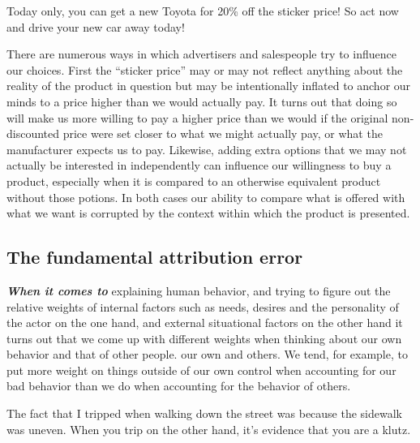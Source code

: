 \documentclass[12pt, openany]{book}
\begin{document}
\begin{center}

\begin{argument}

Today only, you can get a new Toyota for 20\% off the sticker price! So act now and drive your new car away today!

\end{argument}

\end{center}

There are numerous ways in which advertisers and salespeople try to influence our choices. First the ``sticker price'' may or may not reflect anything about the reality of the product in question but may be intentionally inflated to anchor our minds to a price higher than we would actually pay. It turns out that doing so will make us more willing to pay a higher price than we would if the original non-discounted price were set closer to what we might actually pay, or what the manufacturer expects us to pay. Likewise, adding extra options that we may not actually be interested in independently can influence our willingness to buy a product, especially when it is compared to an otherwise equivalent product without those potions. In both cases our ability to compare what is offered with what we want is corrupted by the context within which the product is presented.

\hypertarget{the-fundamental-attribution-error}{%
\subsection*{The fundamental attribution error}\label{the-fundamental-attribution-error}}


\textbf{\emph{When it comes to}} explaining human behavior, and trying to figure out the relative weights of internal factors such as needs, desires and the personality of the actor on the one hand, and external situational factors on the other hand it turns out that we come up with different weights when thinking about our own behavior and that of other people. our own and others. We tend, for example, to put more weight on things outside of our own control when accounting for our bad behavior than we do when accounting for the behavior of others.

\begin{center}

\begin{argument}

The fact that I tripped when walking down the street was because the sidewalk was uneven. When you trip on the other hand, it's evidence that you are a klutz.

\end{argument}

\end{center}
\end{document}
